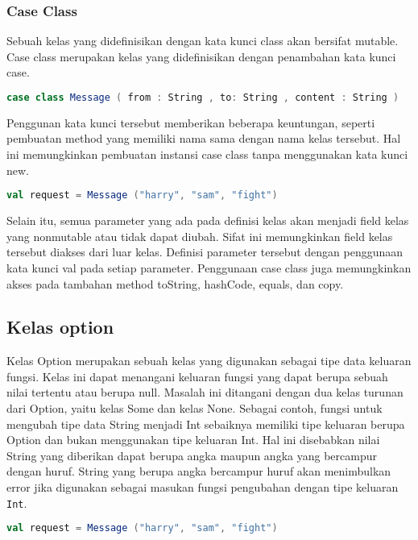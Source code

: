 \subsubsection{Case Class}
Sebuah kelas yang didefinisikan dengan kata kunci class akan bersifat mutable. Case class
merupakan kelas yang didefinisikan dengan penambahan kata kunci case.
\begin{lstlisting}[language=Scala, caption=Definisi \textit{case class}]
case class Message ( from : String , to: String , content : String )
\end{lstlisting}

Penggunan kata kunci tersebut memberikan beberapa keuntungan, seperti pembuatan method
yang memiliki nama sama dengan nama kelas tersebut. Hal ini memungkinkan pembuatan instansi
case class tanpa menggunakan kata kunci new.
\begin{lstlisting}[language=Scala, caption=Pembuatan instansi \textit{case class}]
val request = Message ("harry", "sam", "fight")
\end{lstlisting}

Selain itu, semua parameter yang ada pada definisi kelas akan menjadi field kelas yang nonmutable
atau tidak dapat diubah. Sifat ini memungkinkan field kelas tersebut diakses dari luar kelas.
Definisi parameter tersebut dengan penggunaan kata kunci val pada setiap parameter. Penggunaan
case class juga memungkinkan akses pada tambahan method toString, hashCode, equals, dan
copy.

\subsection{Kelas option}
Kelas Option merupakan sebuah kelas yang digunakan sebagai tipe data keluaran fungsi. Kelas
ini dapat menangani keluaran fungsi yang dapat berupa sebuah nilai tertentu atau berupa null.
Masalah ini ditangani dengan dua kelas turunan dari Option, yaitu kelas Some dan kelas None.
Sebagai contoh, fungsi untuk mengubah tipe data String menjadi Int sebaiknya memiliki tipe
keluaran berupa Option dan bukan menggunakan tipe keluaran Int. Hal ini disebabkan nilai
String yang diberikan dapat berupa angka maupun angka yang bercampur dengan huruf. String
yang berupa angka bercampur huruf akan menimbulkan error jika digunakan sebagai masukan
fungsi pengubahan dengan tipe keluaran \texttt{Int}.
\begin{lstlisting}[language=Scala, caption= Fungsi pengubah \texttt{String} menjadi \texttt{Int}]
val request = Message ("harry", "sam", "fight")
\end{lstlisting}

